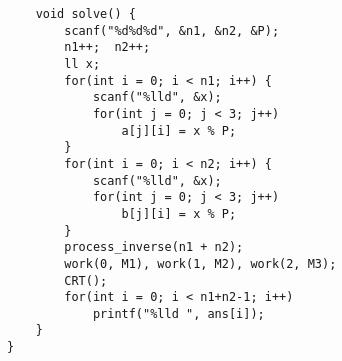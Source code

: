 \begin{verbatim}
    void solve() {  
        scanf("%d%d%d", &n1, &n2, &P);  
        n1++;  n2++;
        ll x;
        for(int i = 0; i < n1; i++) {    
            scanf("%lld", &x);  
            for(int j = 0; j < 3; j++)  
                a[j][i] = x % P;
        }  
        for(int i = 0; i < n2; i++) {  
            scanf("%lld", &x);  
            for(int j = 0; j < 3; j++)   
                b[j][i] = x % P;  
        }  
        process_inverse(n1 + n2);  
        work(0, M1), work(1, M2), work(2, M3);  
        CRT();  
        for(int i = 0; i < n1+n2-1; i++)  
            printf("%lld ", ans[i]);  
    }  
}
\end{verbatim}